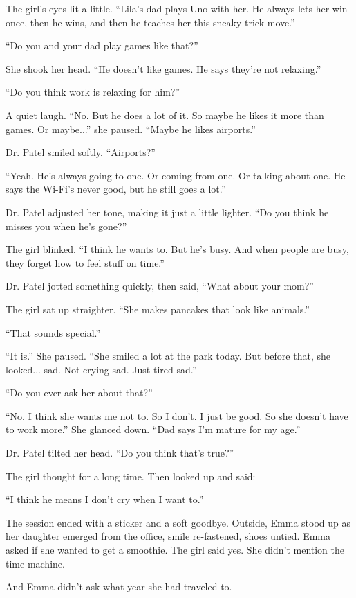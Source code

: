 The girl’s eyes lit a little. ``Lila’s dad plays Uno with her. He always lets her win once, then he wins, and then he teaches her this sneaky trick move.''

``Do you and your dad play games like that?''

She shook her head. ``He doesn’t like games. He says they’re not relaxing.''

``Do you think work is relaxing for him?''

A quiet laugh. ``No. But he does a lot of it. So maybe he likes it more than games. Or maybe...'' she paused. ``Maybe he likes airports.''

Dr. Patel smiled softly. ``Airports?''

``Yeah. He’s always going to one. Or coming from one. Or talking about one. He says the Wi-Fi’s never good, but he still goes a lot.''

Dr. Patel adjusted her tone, making it just a little lighter. ``Do you think he misses you when he’s gone?''

The girl blinked. ``I think he wants to. But he’s busy. And when people are busy, they forget how to feel stuff on time.''

Dr. Patel jotted something quickly, then said, ``What about your mom?''

The girl sat up straighter. ``She makes pancakes that look like animals.''

``That sounds special.''

``It is.'' She paused. ``She smiled a lot at the park today. But before that, she looked... sad. Not crying sad. Just tired-sad.''

``Do you ever ask her about that?''

``No. I think she wants me not to. So I don’t. I just be good. So she doesn’t have to work more.''  
She glanced down. ``Dad says I’m mature for my age.''

Dr. Patel tilted her head. ``Do you think that’s true?''

The girl thought for a long time. Then looked up and said:

``I think he means I don’t cry when I want to.''



The session ended with a sticker and a soft goodbye. Outside, Emma stood up as her daughter emerged from the office, smile re-fastened, shoes untied. Emma asked if she wanted to get a smoothie. The girl said yes. She didn’t mention the time machine.

And Emma didn’t ask what year she had traveled to.

